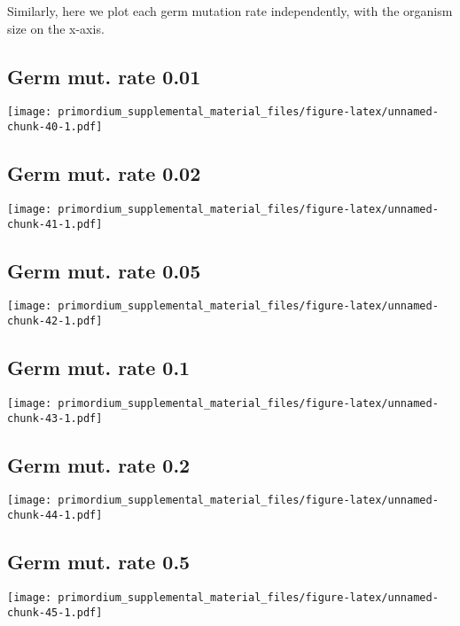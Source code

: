 \documentclass[]{book}
\begin{document}
Similarly, here we plot each germ mutation rate independently, with the organism size on the x-axis.

\hypertarget{germ-mut.-rate-0.01}{%
\subsection{Germ mut. rate 0.01}\label{germ-mut.-rate-0.01}}

\texttt{[image: primordium\_supplemental\_material\_files/figure-latex/unnamed-chunk-40-1.pdf]}

\hypertarget{germ-mut.-rate-0.02}{%
\subsection{Germ mut. rate 0.02}\label{germ-mut.-rate-0.02}}

\texttt{[image: primordium\_supplemental\_material\_files/figure-latex/unnamed-chunk-41-1.pdf]}

\hypertarget{germ-mut.-rate-0.05}{%
\subsection{Germ mut. rate 0.05}\label{germ-mut.-rate-0.05}}

\texttt{[image: primordium\_supplemental\_material\_files/figure-latex/unnamed-chunk-42-1.pdf]}

\hypertarget{germ-mut.-rate-0.1}{%
\subsection{Germ mut. rate 0.1}\label{germ-mut.-rate-0.1}}

\texttt{[image: primordium\_supplemental\_material\_files/figure-latex/unnamed-chunk-43-1.pdf]}

\hypertarget{germ-mut.-rate-0.2}{%
\subsection{Germ mut. rate 0.2}\label{germ-mut.-rate-0.2}}

\texttt{[image: primordium\_supplemental\_material\_files/figure-latex/unnamed-chunk-44-1.pdf]}

\hypertarget{germ-mut.-rate-0.5}{%
\subsection{Germ mut. rate 0.5}\label{germ-mut.-rate-0.5}}

\texttt{[image: primordium\_supplemental\_material\_files/figure-latex/unnamed-chunk-45-1.pdf]}
\end{document}
